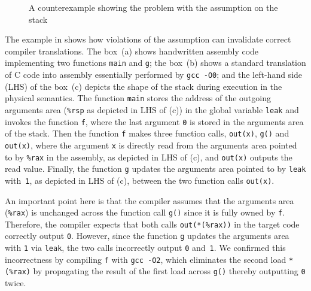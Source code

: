 \begin{figure}[t]
\caption{A counterexample showing the problem with the assumption on the stack}
\label{fig:stack-convention}
\end{figure}

%
The example in  shows how violations of the assumption
can invalidate correct compiler translations.
%
The box~(a) shows handwritten assembly code implementing two functions
\texttt{main} and \texttt{g}; the box~(b) shows a standard translation
of C code into assembly essentially performed by \texttt{gcc -O0}; and
the left-hand side (LHS) of the box~(c) depicts the shape of the stack
during execution in the physical semantics.
The function \texttt{main} stores the address of the
outgoing arguments area (\ie \texttt{\%rsp} as depicted in LHS of (c))
in the global variable \texttt{leak} and invokes the function
\texttt{f}, where the last argument \texttt{0} is stored in the
arguments area of the stack. Then the function \texttt{f} makes three
function calls, \texttt{out(x)}, \texttt{g()} and \texttt{out(x)},
where the argument \texttt{x} is directly read from the arguments area
pointed to by \texttt{\%rax} in the assembly, as depicted in LHS of
(c), and \texttt{out(x)} outputs the read value.  Finally, the
function \texttt{g} updates the arguments area pointed to by
\texttt{leak} with~\texttt{1}, as depicted in LHS of (c), between the
two function calls \texttt{out(x)}.

An important point here is that the compiler assumes that the
arguments area (\ie \texttt{\%rax}) is unchanged across the
function call \texttt{g()} since it is fully owned by \texttt{f}.
Therefore, the compiler expects that both calls
\texttt{out(*(\%rax))} in the target code correctly output
\texttt{0}. However, since the function \texttt{g} updates the
arguments area with \texttt{1} via \texttt{leak}, the two calls
incorrectly output \texttt{0} and~\texttt{1}.
We confirmed this incorrectness by
compiling \texttt{f} with \texttt{gcc -O2}, which
eliminates the second load \texttt{*(\%rax)} by propagating
the result of the first load across \texttt{g()}
thereby outputting \texttt{0} twice.

